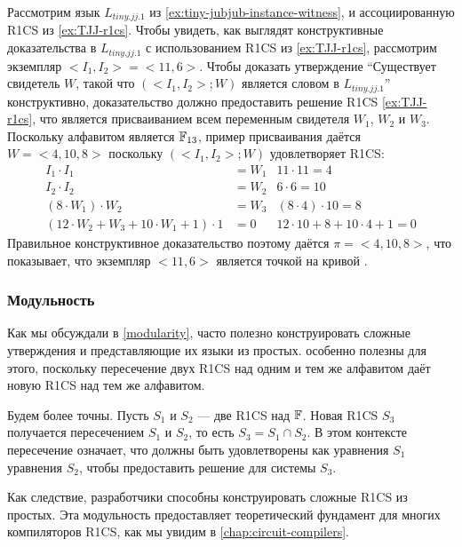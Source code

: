 \begin{example}\label{ex:tiny-jubjub-r1cs} Рассмотрим язык $L_{tiny.jj.1}$ из \examplename{} \ref{ex:tiny-jubjub-instance-witness}, и ассоциированную R1CS из \examplename{} \ref{ex:TJJ-r1cs}. Чтобы увидеть, как выглядят конструктивные доказательства в $L_{tiny.jj.1}$ с использованием R1CS из \examplename{} \ref{ex:TJJ-r1cs}, рассмотрим экземпляр $<I_1,I_2>= <11,6>$. Чтобы доказать утверждение ``Существует свидетель $W$, такой что $(<I_1,I_2>;W)$ является словом в $L_{tiny.jj.1}$'' конструктивно, доказательство должно предоставить решение R1CS \ref{ex:TJJ-r1cs}, что является присваиванием всем переменным свидетеля $W_1$, $W_2$ и $W_3$. Поскольку алфавитом является $\mathbb{F}_{13}$, пример присваивания даётся
$W=<4,10,8>$ поскольку $(<I_1,I_2>;W)$ удовлетворяет R1CS:
\begin{align*}
I_1 \cdot I_1 & = W_1 & 11\cdot 11 = 4\\
I_2 \cdot I_2 & = W_2 & 6 \cdot 6 = 10 \\
(8 \cdot W_1) \cdot W_2 & = W_3 & (8\cdot 4)\cdot 10 = 8\\
(12\cdot W_2 + W_3 + 10\cdot W_1 + 1)\cdot 1 & = 0 & 12\cdot 10 + 8 + 10\cdot 4 + 1 = 0
\end{align*}
Правильное конструктивное доказательство поэтому даётся $\pi=<4,10,8>$, что показывает, что экземпляр $<11,6>$ является точкой на кривой . 
\end{example}
\subsubsection{Модульность}
\label{sec:R1CS_modularity} Как мы обсуждали в \ref{modularity}, часто полезно конструировать сложные утверждения и представляющие их языки из простых.  особенно полезны для этого, поскольку пересечение двух R1CS над одним и тем же алфавитом даёт новую R1CS над тем же алфавитом.

Будем более точны. Пусть $S_1$ и $S_2$ — две R1CS над $\mathbb{F}$. Новая R1CS $S_3$ получается пересечением $S_1$ и $S_2$, то есть $S_3 = S_1\cap S_2$. В этом контексте пересечение означает, что должны быть удовлетворены как уравнения $S_1$  уравнения $S_2$, чтобы предоставить решение для системы $S_3$.

Как следствие, разработчики способны конструировать сложные R1CS из простых. Эта модульность предоставляет теоретический фундамент для многих компиляторов R1CS, как мы увидим в \chaptname{} \ref{chap:circuit-compilers}.

